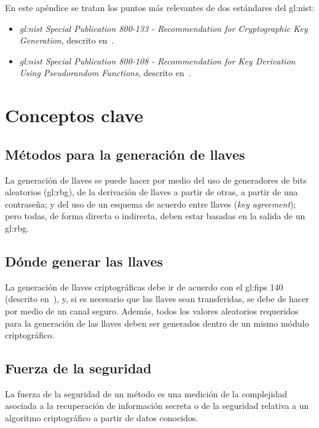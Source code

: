 %
%

%
%
En este apéndice se tratan los puntos más relevantes de dos estándares del
\gls{gl:nist}:

\begin{itemize}
  \item \textit{\gls{gl:nist} Special Publication 800-133 - Recommendation for
    Cryptographic Key Generation}, descrito en~\cite{nist_creacion_llaves}.
  \item \textit{\gls{gl:nist} Special Publication 800-108 - Recommendation for
    Key Derivation Using Pseudorandom Functions}, descrito
    en~\cite{nist_derivacion_llaves}.
\end{itemize}

\section{Conceptos clave}

\subsection{Métodos para la generación de llaves}
La generación de llaves se puede hacer por medio del uso de generadores de
bits aleatorios (\gls{gl:rbg}), de la derivación de llaves a partir de otras,
a partir de una contraseña; y del uso de un esquema de acuerdo entre llaves
(\textit{key agreement}); pero todas, de forma directa o indirecta, deben estar
basadas en la salida de un \gls{gl:rbg}.

\subsection{Dónde generar las llaves}
La generación de llaves criptográficas debe ir de acuerdo con el \gls{gl:fips}
140 (descrito en~\cite{nist_modulos_criptograficos}), y, si es necesario que
las llaves sean transferidas, se debe de hacer por medio de un canal seguro.
Además, todos los valores aleatorios requeridos para la generación de las
llaves deben ser generados dentro de un mismo módulo criptográfico.

\subsection{Fuerza de la seguridad}
La fuerza de la seguridad de un método es una medición de la complejidad
asociada a la recuperación de información secreta o de la seguridad relativa
a un algoritmo criptográfico a partir de datos conocidos.

